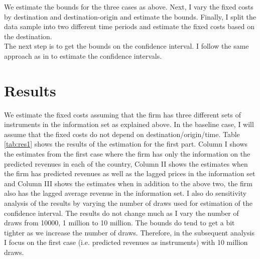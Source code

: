\documentclass[11pt, letterpaper]{article} \usepackage{amsmath}
\begin{document}
We estimate the bounds for the three cases as above. Next, I vary the
fixed costs by destination and destination-origin and estimate the
bounds. Finally, I split the data sample into two different time
periods and estimate the fixed costs based on the
destination. \\
The next step is to get the bounds on the confidence interval. I
follow the same approach as in \citet{dickstein2018} to estimate the
confidence intervals.
\section{Results}
We estimate the fixed costs assuming that the firm has three different
sets of instruments in the information set as explained above. In the
baseline case, I will assume that the fixed costs do not depend on
destination/origin/time. Table \ref{tab:res1} shows the results of the
estimation for the first part. Column I shows the estimates from the
first case where the firm has only the information on the predicted
revenues in each of the country, Column II shows the estimates when
the firm has predicted revenues as well as the lagged prices in the
information set and Column III shows the estimates when in addition to
the above two, the firm also has the lagged average revenue in the
information set.  I also do sensitivity analysis of the results by
varying the number of draws used for estimation of the confidence
interval. The results do not change much as I vary the number of draws
from 10000, 1 million to 10 million. The bounds do tend to get a bit
tighter as we increase the number of draws. Therefore, in the
subsequent analysis I focus on the first case (i.e. predicted revenues
as instruments) with 10 million draws.
\end{document}
